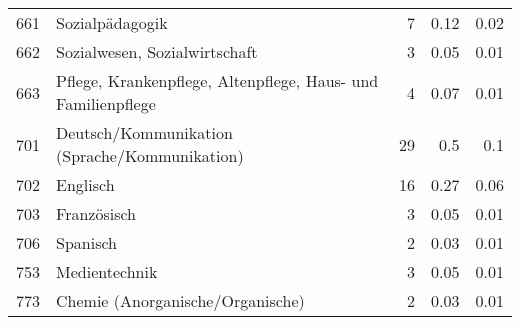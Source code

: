 \begin{longtable}{lXrrr}
        661 & \multicolumn{1}{X}{Sozialpädagogik} & %
          \num{7} &
          \num[round-mode=places,round-precision=2]{0,12} &
          \num[round-mode=places,round-precision=2]{0,02} \\

        662 & \multicolumn{1}{X}{Sozialwesen, Sozialwirtschaft} & %
          \num{3} &
          \num[round-mode=places,round-precision=2]{0,05} &
          \num[round-mode=places,round-precision=2]{0,01} \\

        663 & \multicolumn{1}{X}{Pflege, Krankenpflege, Altenpflege, Haus- und Familienpflege} & %
          \num{4} &
          \num[round-mode=places,round-precision=2]{0,07} &
          \num[round-mode=places,round-precision=2]{0,01} \\

        701 & \multicolumn{1}{X}{Deutsch/Kommunikation (Sprache/Kommunikation)} & %
          \num{29} &
          \num[round-mode=places,round-precision=2]{0,5} &
          \num[round-mode=places,round-precision=2]{0,1} \\

        702 & \multicolumn{1}{X}{Englisch} & %
          \num{16} &
          \num[round-mode=places,round-precision=2]{0,27} &
          \num[round-mode=places,round-precision=2]{0,06} \\

        703 & \multicolumn{1}{X}{Französisch} & %
          \num{3} &
          \num[round-mode=places,round-precision=2]{0,05} &
          \num[round-mode=places,round-precision=2]{0,01} \\

        706 & \multicolumn{1}{X}{Spanisch} & %
          \num{2} &
          \num[round-mode=places,round-precision=2]{0,03} &
          \num[round-mode=places,round-precision=2]{0,01} \\

        753 & \multicolumn{1}{X}{Medientechnik} & %
          \num{3} &
          \num[round-mode=places,round-precision=2]{0,05} &
          \num[round-mode=places,round-precision=2]{0,01} \\

        773 & \multicolumn{1}{X}{Chemie (Anorganische/Organische)} & %
          \num{2} &
          \num[round-mode=places,round-precision=2]{0,03} &
          \num[round-mode=places,round-precision=2]{0,01} \\


\end{longtable}
